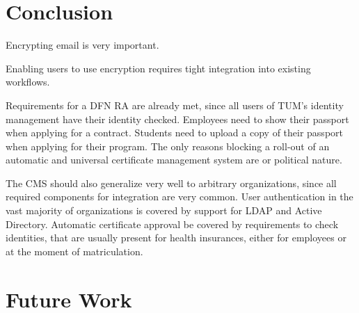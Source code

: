\begin{abstract}
    
\end{abstract}

\begin{otherlanguage}{ngerman}
    \begin{abstract}
        
    \end{abstract}
\end{otherlanguage}

\setcounter{tocdepth}{1}
\tableofcontents
\listoffigures

\startcontent











\chapter{Conclusion}\label{ch:conclusion}
Encrypting email is very important.

Enabling users to use encryption requires tight integration into existing workflows.

Requirements for a DFN RA are already met, since all users of TUM's identity management have their identity checked.
Employees need to show their passport when applying for a contract.
Students need to upload a copy of their passport when applying for their program.
The only reasons blocking a roll-out of an automatic and universal certificate management system are or political
nature.

The CMS should also generalize very well to arbitrary organizations, since all required components for integration are
very common.
User authentication in the vast majority of organizations is covered by support for LDAP and Active Directory.
Automatic certificate approval be covered by requirements to check identities, that are usually present for health
insurances, either for employees or at the moment of matriculation.

\chapter{Future Work}\label{ch:futureWork}

